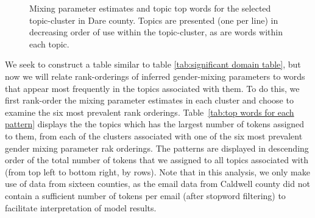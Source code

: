 \documentclass{pnastwo}
\begin{document}
\begin{article}
\begin{figure}
\begin{tabular}{m{}}
	\end{tabular}
	\caption{\label{tab: hoke 3 mp} Mixing parameter estimates and topic top words for the selected topic-cluster in Dare county. Topics are presented (one per line) in decreasing order of use within the topic-cluster, as are words within each topic.}
\end{figure}

We seek to construct a table similar to table \ref{tab:significant domain table}, but now we will relate rank-orderings of inferred gender-mixing parameters to words that appear most frequently in the topics associated with them. To do this, we first rank-order the mixing parameter estimates in each cluster and choose to examine the six most prevalent rank orderings. Table~\ref{tab:top words for each pattern} displays the the topics which has the largest number of tokens assigned to them, from each of the clusters associated with one of the six most prevalent gender mixing parameter rak orderings. The patterns are displayed in descending order of the total number of tokens that we assigned to all topics associated with (from top left to bottom right, by rows). Note that in this analysis, we only make use of data from sixteen counties, as the email data from Caldwell county did not contain a sufficient number of tokens per email (after stopword filtering) to facilitate interpretation of model results.  




\end{article}
\end{document}

